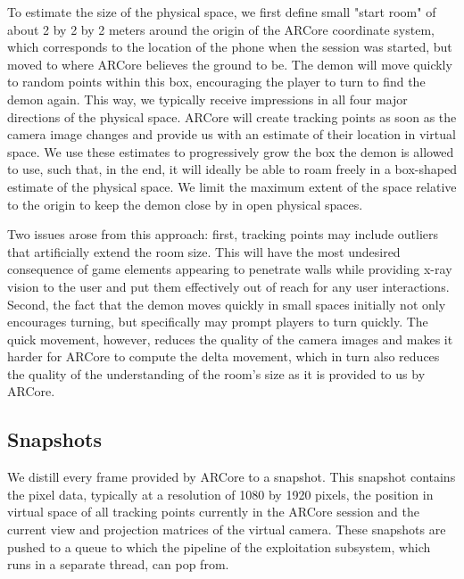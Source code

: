 To estimate the size of the physical space, we first define small "start room" of about 2 by 2 by 2 meters around the origin of the ARCore coordinate system, which corresponds to the location of the phone when the session was started, but moved to where ARCore believes the ground to be. The demon will move quickly to random points within this box, encouraging the player to turn to find the demon again. This way, we typically receive impressions in all four major directions of the physical space. ARCore will create tracking points as soon as the camera image changes and provide us with an estimate of their location in virtual space. We use these estimates to progressively grow the box the demon is allowed to use, such that, in the end, it will ideally be able to roam freely in a box-shaped estimate of the physical space. We limit the maximum extent of the space relative to the origin to keep the demon close by in open physical spaces.

Two issues arose from this approach: first, tracking points may include outliers that artificially extend the room size. This will have the most undesired consequence of game elements appearing to penetrate walls while providing x-ray vision to the user and put them effectively out of reach for any user interactions. Second, the fact that the demon moves quickly in small spaces initially not only encourages turning, but specifically may prompt players to turn quickly. The quick movement, however, reduces the quality of the camera images and makes it harder for ARCore to compute the delta movement, which in turn also reduces the quality of the understanding of the room's size as it is provided to us by ARCore.

\subsection{Snapshots}
We distill every frame provided by ARCore to a snapshot. This snapshot contains the pixel data, typically at a resolution of 1080 by 1920 pixels, the position in virtual space of all tracking points currently in the ARCore session and the current view and projection matrices of the virtual camera. These snapshots are pushed to a queue to which the pipeline of the exploitation subsystem, which runs in a separate thread, can pop from.

